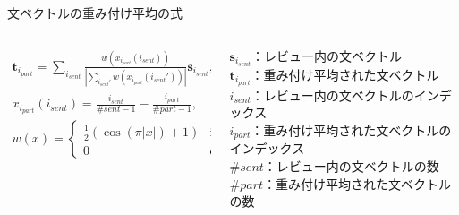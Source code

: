 \documentclass[unicode,10pt]{beamer}
\newlength{\mycolumnwidth}
\begin{document}
\begin{frame}{文ベクトルの重み付け平均の式}{}
  \begin{columns}
    \begin{column}{\mycolumnwidth}
      \begin{gather*}
        \mathbf{t}_{i_{part}} = \sum_{i_{sent}}
                                \frac{w(x_{i_{part}}(i_{sent}))}
                                     {|\sum_{i_{sent}'}
                                      w(x_{i_{part}}(i_{sent}'))|}
                                \mathbf{s}_{i_{sent}}, \\
        x_{i_{part}}(i_{sent}) = \frac{i_{sent}}{\#sent - 1}
                                 - \frac{i_{part}}{\#part - 1}, \\
        w(x) = \begin{cases}
          \frac{1}{2} (\cos(\pi|x|) + 1) & \text{if $|x| \leq 1$} \\
          0 & \text{otherwise}
        \end{cases}
      \end{gather*}
    \end{column}
    \begin{column}{\mycolumnwidth}
      $\mathbf{s}_{i_{sent}}$：レビュー内の文ベクトル \\
      $\mathbf{t}_{i_{part}}$：重み付け平均された文ベクトル \\
      $i_{sent}$：レビュー内の文ベクトルのインデックス \\
      $i_{part}$：重み付け平均された文ベクトルのインデックス \\
      $\#sent$：レビュー内の文ベクトルの数 \\
      $\#part$：重み付け平均された文ベクトルの数
    \end{column}
  \end{columns}
\end{frame}
\end{document}
